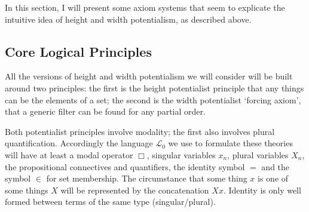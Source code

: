 \documentclass{article}
\begin{document}
In this section, I will present some axiom systems that seem to 
explicate the intuitive idea of height and width potentialism, as 
described above.

\subsection{Core Logical Principles}
All the versions of height and width potentialism we will consider will be built around
two principles: the first is the height potentialist principle that any things can be 
the elements of a set; the second is the width potentialist `forcing axiom', that 
a generic filter can be found for any partial order. 

Both potentialist principles involve modality; the first also involves plural 
quantification. Accordingly the language $\mathcal{L}_0$
we use to formulate these theories 
will have at least a modal operator $\Box$, singular variables $x_n$, plural variables 
$X_n$, the propositional connectives and quantifiers, the identity symbol $=$ 
and the symbol $\in$ for set membership. The circumstance that some thing $x$ is 
one of some things $X$ will be represented by the concatenation $Xx$. Identity 
is only well formed between terms of the same type (singular/plural). 
\end{document}
